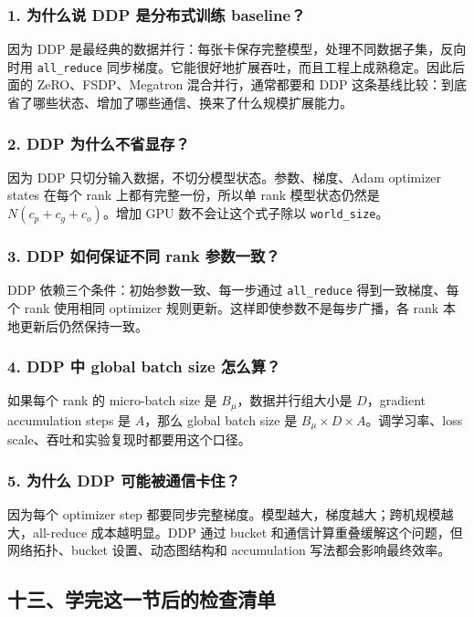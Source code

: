 \subsubsection*{1. 为什么说 DDP 是分布式训练 baseline？}

因为 DDP 是最经典的数据并行：每张卡保存完整模型，处理不同数据子集，反向时用 \texttt{all\_reduce} 同步梯度。它能很好地扩展吞吐，而且工程上成熟稳定。因此后面的 ZeRO、FSDP、Megatron 混合并行，通常都要和 DDP 这条基线比较：到底省了哪些状态、增加了哪些通信、换来了什么规模扩展能力。

\subsubsection*{2. DDP 为什么不省显存？}

因为 DDP 只切分输入数据，不切分模型状态。参数、梯度、Adam optimizer states 在每个 rank 上都有完整一份，所以单 rank 模型状态仍然是 $N(c_p + c_g + c_o)$。增加 GPU 数不会让这个式子除以 \texttt{world\_size}。

\subsubsection*{3. DDP 如何保证不同 rank 参数一致？}

DDP 依赖三个条件：初始参数一致、每一步通过 \texttt{all\_reduce} 得到一致梯度、每个 rank 使用相同 optimizer 规则更新。这样即使参数不是每步广播，各 rank 本地更新后仍然保持一致。

\subsubsection*{4. DDP 中 global batch size 怎么算？}

如果每个 rank 的 micro-batch size 是 $B_{\mu}$，数据并行组大小是 $D$，gradient accumulation steps 是 $A$，那么 global batch size 是 $B_{\mu} \times D \times A$。调学习率、loss scale、吞吐和实验复现时都要用这个口径。

\subsubsection*{5. 为什么 DDP 可能被通信卡住？}

因为每个 optimizer step 都要同步完整梯度。模型越大，梯度越大；跨机规模越大，all-reduce 成本越明显。DDP 通过 bucket 和通信计算重叠缓解这个问题，但网络拓扑、bucket 设置、动态图结构和 accumulation 写法都会影响最终效率。

\subsection{十三、学完这一节后的检查清单}


